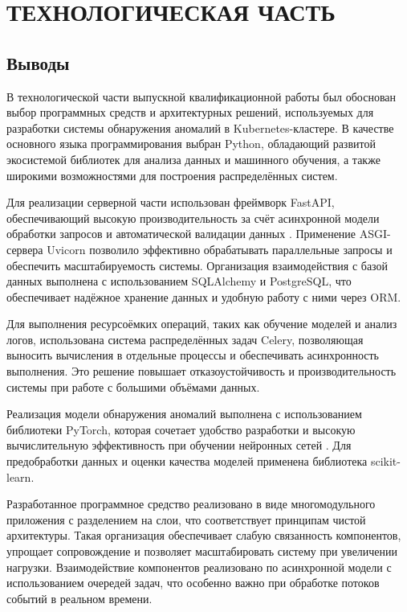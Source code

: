 \section{ТЕХНОЛОГИЧЕСКАЯ ЧАСТЬ}






\subsection{Выводы}

В технологической части выпускной квалификационной работы был обоснован выбор программных средств и архитектурных решений, используемых для разработки системы обнаружения аномалий в Kubernetes-кластере. В качестве основного языка программирования выбран Python, обладающий развитой экосистемой библиотек для анализа данных и машинного обучения, а также широкими возможностями для построения распределённых систем.

Для реализации серверной части использован фреймворк FastAPI, обеспечивающий высокую производительность за счёт асинхронной модели обработки запросов и автоматической валидации данных \cite{FastAPI}. Применение ASGI-сервера Uvicorn позволило эффективно обрабатывать параллельные запросы и обеспечить масштабируемость системы. Организация взаимодействия с базой данных выполнена с использованием SQLAlchemy и PostgreSQL, что обеспечивает надёжное хранение данных и удобную работу с ними через ORM.

Для выполнения ресурсоёмких операций, таких как обучение моделей и анализ логов, использована система распределённых задач Celery, позволяющая выносить вычисления в отдельные процессы и обеспечивать асинхронность выполнения. Это решение повышает отказоустойчивость и производительность системы при работе с большими объёмами данных.

Реализация модели обнаружения аномалий выполнена с использованием библиотеки PyTorch, которая сочетает удобство разработки и высокую вычислительную эффективность при обучении нейронных сетей \cite{PyTorch}. Для предобработки данных и оценки качества моделей применена библиотека scikit-learn.

Разработанное программное средство реализовано в виде многомодульного приложения с разделением на слои, что соответствует принципам чистой архитектуры. Такая организация обеспечивает слабую связанность компонентов, упрощает сопровождение и позволяет масштабировать систему при увеличении нагрузки. Взаимодействие компонентов реализовано по асинхронной модели с использованием очередей задач, что особенно важно при обработке потоков событий в реальном времени.


